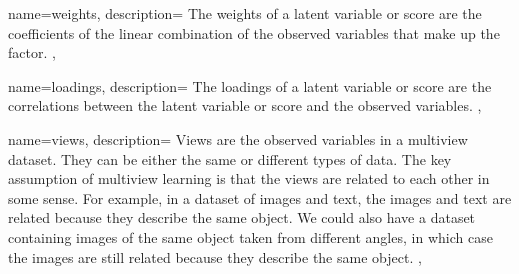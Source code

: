  {
    name={weights},
    description={
        The weights of a latent variable or score are the coefficients of the linear combination of the observed variables that make up the factor.
    },
}

 {
    name={loadings},
    description={
        The loadings of a latent variable or score are the correlations between the latent variable or score and the observed variables.
    },
}

 {
    name={views},
    description={
        Views are the observed variables in a multiview dataset.
        They can be either the same or different types of data.
        The key assumption of multiview learning is that the views are related to each other in some sense.
        For example, in a dataset of images and text, the images and text are related because they describe the same object.
        We could also have a dataset containing images of the same object taken from different angles, in which case the images are still related because they describe the same object.
    },
}